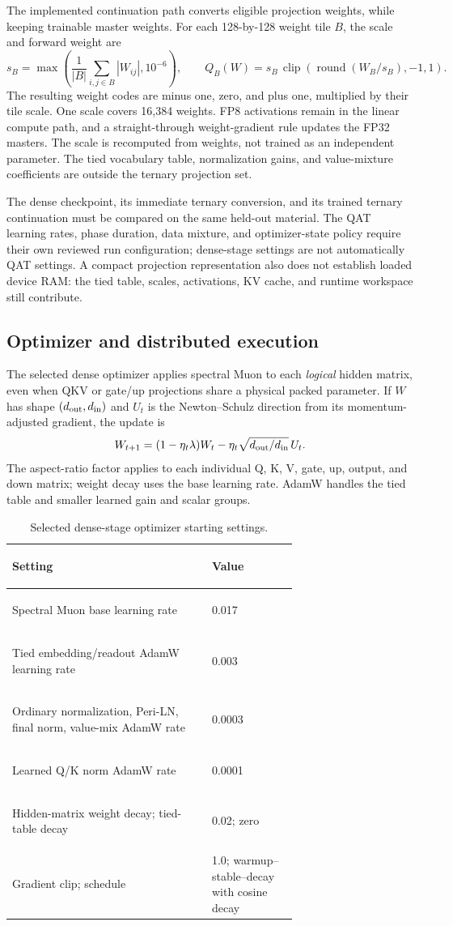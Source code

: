 \documentclass[11pt]{article}
\begin{document}
The implemented continuation path converts eligible projection weights,
while keeping trainable master weights. For each 128-by-128 weight tile
$B$, the scale and forward weight are
\[
  s_B=\max\!\left(\frac{1}{|B|}\sum_{i,j\in B}|W_{ij}|,10^{-6}\right),
  \qquad
  Q_B(W)=s_B\,\operatorname{clip}
     \!\left(\operatorname{round}(W_B/s_B),-1,1\right).
\]
The resulting weight codes are minus one, zero, and plus one, multiplied
by their tile scale. One scale covers 16,384 weights. FP8 activations
remain in the linear compute path, and a straight-through weight-gradient
rule updates the FP32 masters. The scale is recomputed from weights, not
trained as an independent parameter. The tied vocabulary table,
normalization gains, and value-mixture coefficients are outside the
ternary projection set.

The dense checkpoint, its immediate ternary conversion, and its trained
ternary continuation must be compared on the same held-out material.
The QAT learning rates, phase duration, data mixture, and optimizer-state
policy require their own reviewed run configuration; dense-stage settings
are not automatically QAT settings. A compact projection representation
also does not establish loaded device RAM: the tied table, scales,
activations, KV cache, and runtime workspace still contribute.

\subsection{Optimizer and distributed execution}

The selected dense optimizer applies spectral Muon to each \emph{logical}
hidden matrix, even when QKV or gate/up projections share a physical packed
parameter. If $W$ has shape $(d_{\rm out},d_{\rm in})$ and $U_t$ is the
Newton--Schulz direction from its momentum-adjusted gradient, the update is
\[
  W_{t+1}=(1-\eta_t\lambda)W_t
    -\eta_t\sqrt{d_{\rm out}/d_{\rm in}}\,U_t .
\]
The aspect-ratio factor applies to each individual Q, K, V, gate, up,
output, and down matrix; weight decay uses the base learning rate.
AdamW handles the tied table and smaller learned gain and scalar groups.

\begin{table}[H]
\centering\small
\caption{Selected dense-stage optimizer starting settings.}
\begin{tabularx}{\linewidth}{@{}>{\bfseries\raggedright\arraybackslash}p{0.70\linewidth}X@{}}
\toprule
Setting & Value \\
\midrule
Spectral Muon base learning rate & 0.017 \\
Tied embedding/readout AdamW learning rate & 0.003 \\
Ordinary normalization, Peri-LN, final norm, value-mix AdamW rate & 0.0003 \\
Learned Q/K norm AdamW rate & 0.0001 \\
Hidden-matrix weight decay; tied-table decay & 0.02; zero \\
Gradient clip; schedule & 1.0; warmup--stable--decay with cosine decay \\
\bottomrule
\end{tabularx}
\end{table}
\end{document}
